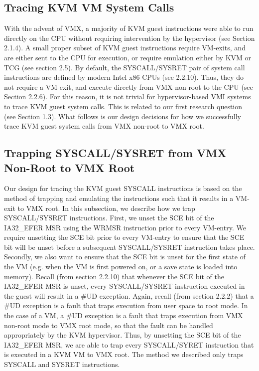 \documentclass{report}
\begin{document}
\begin{spacing}{1.5}
\section{Tracing KVM VM System Calls}
{\large
With the advent of VMX, a majority of KVM guest instructions were able to run directly on the CPU without requiring intervention by the hypervisor (see Section 2.1.4). A small proper subset of KVM guest instructions require VM-exits, and are either sent to the CPU for execution, or require emulation either by KVM or TCG (see section 2.5). By default, the SYSCALL/SYSRET pair of system call instructions are defined by modern Intel x86 CPUs (see 2.2.10). Thus, they do not require a VM-exit, and execute directly from VMX non-root to the CPU (see Section 2.2.6). For this reason, it is not trivial for hypervisor-based VMI systems to trace KVM guest system calls. This is related to our first research question (see Section 1.3). What follows is our design decisions for how we successfully trace KVM guest system calls from VMX non-root to VMX root.
\newline
}


\subsection{Trapping SYSCALL/SYSRET from VMX Non-Root to VMX Root}
{\large
Our design for tracing the KVM guest SYSCALL instructions is based on the method of trapping and emulating the instructions such that it results in a VM-exit to VMX root. In this subsection, we describe how we trap SYSCALL/SYSRET instructions. First, we unset the SCE bit of the IA32\_EFER MSR using the WRMSR instruction prior to every VM-entry. We require unsetting the SCE bit prior to every VM-entry to ensure that the SCE bit will be unset before a subsequent SYSCALL/SYSRET instruction takes place. Secondly, we also want to ensure that the SCE bit is unset for the first state of the VM (e.g. when the VM is first powered on, or a save state is loaded into memory). Recall (from section 2.2.10) that whenever the SCE bit of the IA32\_EFER MSR is unset, every SYSCALL/SYSRET instruction executed in the guest will result in a \#UD exception. Again, recall (from section 2.2.2) that a \#UD exception is a fault that traps execution from user space to root mode. In the case of a VM, a \#UD exception is a fault that traps execution from VMX non-root mode to VMX root mode, so that the fault can be handled appropriately by the KVM hypervisor. Thus, by unsetting the SCE bit of the IA32\_EFER MSR, we are able to trap every SYSCALL/SYRET instruction that is executed in a KVM VM to VMX root. The method we described only traps SYSCALL and SYSRET instructions.
\newline
}








\end{spacing}
\end{document}
